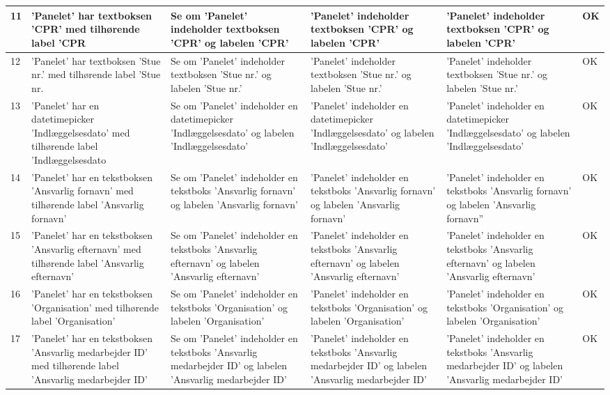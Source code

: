  \begin{table}[H]
\begin{tabular}{|p{0.5cm}|p{4cm}|p{3cm}|p{3cm}|p{3cm}|p{1cm}|}
\hline
 11 & 'Panelet' har textboksen 'CPR' med tilhørende label 'CPR & Se om 'Panelet' indeholder textboksen 'CPR' og labelen 'CPR' & 'Panelet' indeholder textboksen 'CPR' og labelen 'CPR' & 'Panelet' indeholder textboksen 'CPR' og labelen 'CPR' & OK \\\hline
 12 & 'Panelet' har textboksen 'Stue nr.' med tilhørende label 'Stue nr. & Se om 'Panelet' indeholder textboksen 'Stue nr.' og labelen 'Stue nr.' & 'Panelet' indeholder textboksen 'Stue nr.' og labelen 'Stue nr.' &'Panelet' indeholder textboksen 'Stue nr.' og labelen 'Stue nr.'& OK \\\hline
 13 & 'Panelet' har en datetimepicker 'Indlæggelsesdato' med tilhørende label 'Indlæggelsesdato & Se om 'Panelet' indeholder en datetimepicker 'Indlæggelsesdato' og labelen 'Indlæggelsesdato' & 'Panelet' indeholder en datetimepicker 'Indlæggelsesdato' og labelen 'Indlæggelsesdato' &'Panelet' indeholder en datetimepicker 'Indlæggelsesdato' og labelen 'Indlæggelsesdato' & OK \\\hline 
 14 & 'Panelet' har en tekstboksen 'Ansvarlig fornavn' med tilhørende label 'Ansvarlig fornavn' & Se om 'Panelet' indeholder en tekstboks 'Ansvarlig fornavn' og labelen 'Ansvarlig fornavn' & 'Panelet' indeholder en tekstboks 'Ansvarlig fornavn' og labelen 'Ansvarlig fornavn' & 'Panelet' indeholder en tekstboks 'Ansvarlig fornavn' og labelen 'Ansvarlig fornavn'' & OK \\\hline
 15 & 'Panelet' har en tekstboksen 'Ansvarlig efternavn' med tilhørende label 'Ansvarlig efternavn' & Se om 'Panelet' indeholder en tekstboks 'Ansvarlig efternavn' og labelen 'Ansvarlig efternavn' & 'Panelet' indeholder en tekstboks 'Ansvarlig efternavn' og labelen 'Ansvarlig efternavn' & 'Panelet' indeholder en tekstboks 'Ansvarlig efternavn' og labelen 'Ansvarlig efternavn' & OK \\\hline
  16 & 'Panelet' har en tekstboksen 'Organisation' med tilhørende label 'Organisation' & Se om 'Panelet' indeholder en tekstboks 'Organisation' og labelen 'Organisation' & 'Panelet' indeholder en tekstboks 'Organisation' og labelen 'Organisation' & 'Panelet' indeholder en tekstboks 'Organisation' og labelen 'Organisation'& OK \\\hline
17 & 'Panelet' har en tekstboksen 'Ansvarlig medarbejder ID' med tilhørende label 'Ansvarlig medarbejder ID' & Se om 'Panelet' indeholder en tekstboks 'Ansvarlig medarbejder ID' og labelen 'Ansvarlig medarbejder ID' & 'Panelet' indeholder en tekstboks 'Ansvarlig medarbejder ID' og labelen 'Ansvarlig medarbejder ID' & 'Panelet' indeholder en tekstboks 'Ansvarlig medarbejder ID' og labelen 'Ansvarlig medarbejder ID' & OK \\\hline
 \end{tabular}
 \end{table}
 
